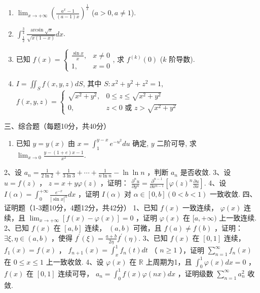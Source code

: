 \documentclass[11pt,fontset=fandol]{ctexart}
\providecommand{\tightlist}{\setlength{\itemsep}{0pt}\setlength{\parskip}{0pt}}
\begin{document}
\begin{enumerate}
\def\labelenumi{\arabic{enumi}.}
\item
  \(\lim_{x \to +\infty} \left( \frac{a^x - 1}{(a-1)x} \right)^{\frac{1}{x}}\)
  (\(a > 0, a \neq 1\)).
\item
  \(\int_{\frac{1}{2}}^{\frac{3}{4}} \frac{\arcsin \sqrt{x}}{\sqrt{x(1-x)}} dx\).
\item
  已知
  \(f(x) = \begin{cases} \frac{\sin x}{x}, & x \neq 0 \\ 1, & x = 0 \end{cases}\),
  求 \(f^{(k)}(0)\) (\(k\) 阶导数).
\item
  \(I = \iint_S f(x,y,z) dS\), 其中 \(S: x^2 + y^2 + z^2 = 1\),
  \(f(x,y,z) = \begin{cases} \sqrt{x^2 + y^2}, & 0 \leq z \leq \sqrt{x^2 + y^2} \\ 0, & z < 0 \text{ 或 } z > \sqrt{x^2 + y^2} \end{cases}\)
\end{enumerate}

三、综合题（每题10分，共40分）

\begin{enumerate}
\def\labelenumi{\arabic{enumi}.}
\tightlist
\item
  已知 \(y = y(x)\) 由 \(x = \int_1^{y-x} e^{-u^2} du\) 确定, \(y\)
  二阶可导, 求 \(\lim_{x \to 0} \frac{y - (1+e)x - 1}{x^2}\).
\end{enumerate}

2、设
\(a_{n}=\frac{1}{2\ln 2}+\frac{1}{3\ln 3}+\cdots+\frac{1}{n\ln n}-\ln \ln n\)
，判断 \(a_{n}\) 是否收敛. 3、设 \(u=f(z)\) ， \(z=x+y\varphi(z)\)
，证明：
\(\frac{\partial^{n}u}{\partial y^{n}}=\frac{\partial^{n-1}}{\partial x^{n-1}}\left[\varphi(z)^{n}\frac{\partial u}{\partial x}\right].\)
4、设 \(I(\alpha)=\int_{0}^{+\infty}\frac{e^{-x}}{|\sin x|^{\alpha}}dx\)
，证明 \(I(\alpha)\) 对 \(\alpha \in[0,b](0<b<1)\) 一致收敛.
四、证明题（1-3题10分，4题12分，共42分） 1、已知 \(f(x)\) 一致连续，
\(\varphi(x)\) 连续，且 \(\lim_{x \to +\infty}[f(x)-\varphi(x)]=0\)
，证明 \(\varphi(x)\) 在 \([a,+\infty)\) 上一致连续. 2、已知 \(f(x)\) 在
\([a,b]\) 连续， \((a,b)\) 可微，且 \(f(a)\neq f(b)\) ，证明：
\(\exists \xi,\eta \in(a,b)\) ，使得
\(f^{\prime}(\xi)=\frac{a+b}{2\eta}f^{\prime}(\eta).\) 3、已知 \(f(x)\)
在 \([0,1]\) 连续， \(f_{1}(x)=f(x)\) ，
\(f_{n+1}(x)=\int_{x}^{1}f_{n}(t)dt\) （ \(n\geq 1\) ），证明
\(\sum_{n=1}^{\infty}f_{n}(x)\) 在 \(0\leq x\leq 1\) 上一致收敛. 4、设
\(\varphi(x)\) 在 \(\mathbb{R}\) 上周期为1，且
\(\int_{0}^{1}\varphi(x)dx=0\) ， \(f(x)\) 在 \([0,1]\) 连续可导，
\(a_{n}=\int_{0}^{1}f(x)\varphi(nx)dx\) ，证明级数
\(\sum_{n=1}^{\infty}a_{n}^{2}\) 收敛.
\end{document}
